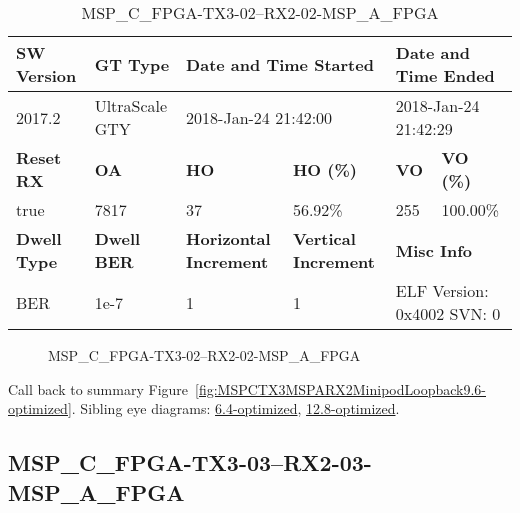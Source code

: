 \begin{table}[h]
\centering
\caption{MSP\_C\_FPGA-TX3-02--RX2-02-MSP\_A\_FPGA}
\label{tab:MSPCFPGATX302RX202MSPAFPGA9.6-optimized}
\begin{tabular}{@{}|l|l|l|l|l|l|@{}}
\toprule
\textbf{SW Version}                & \textbf{GT Type}   & \multicolumn{2}{l|}{\textbf{Date and Time Started}}            & \multicolumn{2}{l|}{\textbf{Date and Time Ended}}        \\ \midrule
2017.2                       & UltraScale GTY          & \multicolumn{2}{l|}{2018-Jan-24 21:42:00}                   & \multicolumn{2}{l|}{2018-Jan-24 21:42:29}               \\ \midrule
\textbf{Reset RX}                  & \textbf{OA} & \textbf{HO}   & \textbf{HO (\%)} & \textbf{VO} & \textbf{VO (\%)} \\ \midrule
true & 7817        & 37          & 56.92\%        & 255        & 100.00\%       \\ \midrule
\textbf{Dwell Type}                & \textbf{Dwell BER} & \textbf{Horizontal Increment} & \textbf{Vertical Increment}    & \multicolumn{2}{l|}{\textbf{Misc Info}}                  \\ \midrule
BER                            & 1e-7        & 1        & 1           & \multicolumn{2}{l|}{ELF Version: 0x4002 SVN: 0}                         \\ \bottomrule
\end{tabular}
\end{table}

\begin{figure}[h]
\caption{MSP\_C\_FPGA-TX3-02--RX2-02-MSP\_A\_FPGA} \label{fig:MSPCFPGATX302RX202MSPAFPGA9.6-optimized}
\end{figure}

Call back to summary Figure~\ref{fig:MSPCTX3MSPARX2MinipodLoopback9.6-optimized}.
Sibling eye diagrams: \hyperref[sec:MSPCFPGATX302RX202MSPAFPGA6.4-optimized]{6.4-optimized}, \hyperref[sec:MSPCFPGATX302RX202MSPAFPGA12.8-optimized]{12.8-optimized}.

\clearpage
\newpage


\subsection{MSP\_C\_FPGA-TX3-03--RX2-03-MSP\_A\_FPGA}\label{sec:MSPCFPGATX303RX203MSPAFPGA9.6-optimized}

